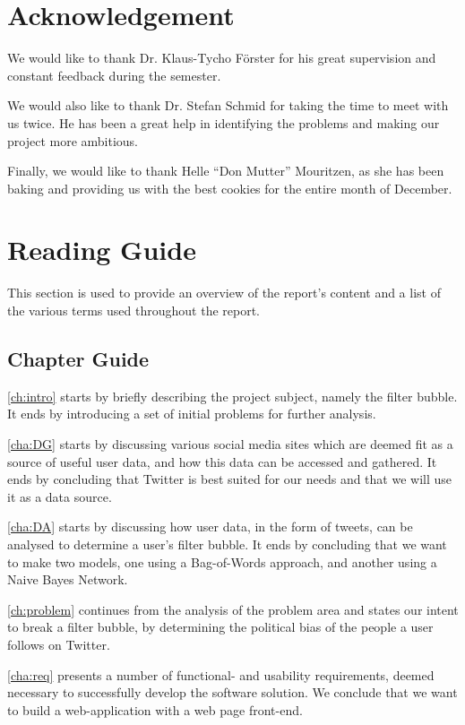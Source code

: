 \section*{Acknowledgement}
We would like to thank Dr. Klaus-Tycho Förster for his great supervision
and constant feedback during the semester.\nl

We would also like to thank Dr. Stefan Schmid for taking the time to meet with
us twice. He has been a great help in identifying the problems and making our
project more ambitious.\nl

Finally, we would like to thank Helle ``Don Mutter'' Mouritzen, as she has been
baking and providing us with the best cookies for the entire month of
December.\newpage


\section{Reading Guide}\label{sec:readingGuide}
This section is used to provide an overview of the report's content and a list
of the various terms used throughout the report.

\subsection{Chapter Guide}
\autoref{ch:intro} starts by briefly describing the project subject, namely  the
filter bubble. It ends by introducing a set of initial problems for further
analysis.\nl

\autoref{cha:DG} starts by discussing various social media sites which are
deemed fit as a source of useful user data, and how this data can be
accessed and gathered. It ends by concluding that Twitter is best suited for our
needs and that we will use it as a data source.\nl

\autoref{cha:DA} starts by discussing how user data, in the form of tweets, can
be analysed to determine a user's filter bubble. It ends by concluding
that we want to make two models, one using a Bag-of-Words approach, and another
using a Naive Bayes Network.\nl

\autoref{ch:problem} continues from the analysis of the problem area and states
our intent to break a filter bubble, by determining the political bias of the
people a user follows on Twitter.\nl

\autoref{cha:req} presents a number of functional- and usability requirements,
deemed necessary to successfully develop the software solution. We conclude that
we want to build a web-application with a web page front-end.\nl

